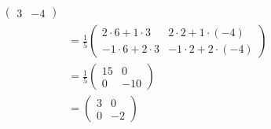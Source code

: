 \begin{checkanswer}
\begin{align*}
\begin{pmatrix}
      3&-4
    \end{pmatrix}\\
    &=
    \frac{1}{5}
    \begin{pmatrix}
      2\cdot 6+1\cdot 3&2\cdot 2+1\cdot (-4)\\
      -1\cdot 6+2\cdot 3&-1\cdot 2+2\cdot (-4)
    \end{pmatrix}\\
    &=
    \frac{1}{5}
    \begin{pmatrix}
      15&0\\
      0&-10
    \end{pmatrix}\\
    &=
    \begin{pmatrix}
      3&0\\
      0&-2
    \end{pmatrix}
  \end{align*}
\end{checkanswer}



